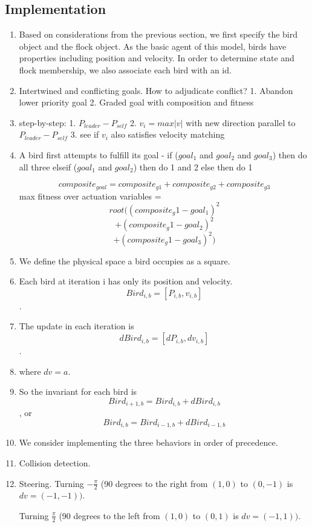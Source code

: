 \documentclass{article}
\begin{document}
\subsection{Implementation}
  \begin{enumerate}
    \item Based on considerations from the previous section, we first specify
      the bird object and the flock object. As the basic agent of this model,
      birds have properties including position and velocity. In order to
      determine state and flock membership, we also associate each bird with
      an id.

    \item Intertwined and conflicting goals. How to adjudicate conflict?
      1. Abandon lower priority goal
      2. Graded goal with composition and fitness

    \item step-by-step:
      1. $P_{leader} - P_{self}$ %
      2. $v_{i} = max |v|$ with new direction parallel to $P_{leader} - P_{self}$ %
      3. see if $v_{i}$ also satisfies velocity matching

    \item A bird first attempts to fulfill its goal -
      if ($goal_1$ and $goal_2$ and $goal_3$)
        then do all three
      elseif ($goal_1$ and $goal_2$)
        then do 1 and 2
      else
        then do 1

      $$composite_{goal} = composite_{g1} + composite_{g2} + composite_{g3}$$
      max fitness over actuation variables =
        $$root((composite_g1 - goal_1)^2$$
          $$+ (composite_g1 - goal_2)^2$$
          $$+ (composite_g1 - goal_3)^2)$$



    \item We define the physical space a bird occupies as a square.
    \item Each bird at iteration i has only its position and velocity.
      $$Bird_{i,b} = [P_{i,b}, v_{i,b}]$$.
    \item The update in each iteration is
      $$dBird_{i,b} = [dP_{i,b}, dv_{i,b}]$$.
    \item where $dv = a$.
    \item So the invariant for each bird is
      $$Bird_{i+1,b} = Bird_{i,b} + dBird_{i,b}$$, or
      $$Bird_{i,b} = Bird_{i-1,b} + dBird_{i-1,b}$$

    \item We consider implementing the three behaviors in order of precedence.

    \item Collision detection.

    \item Steering. Turning $-\frac{\pi}{2}$ (90 degrees to the right from
      $(1,0)$ to $(0,-1)$ is $dv = (-1, -1))$.

      Turning $\frac{\pi}{2}$ (90 degrees to the left from
      $(1,0)$ to $(0,1)$ is $dv = (-1, 1))$.

  \end{enumerate}
\end{document}
